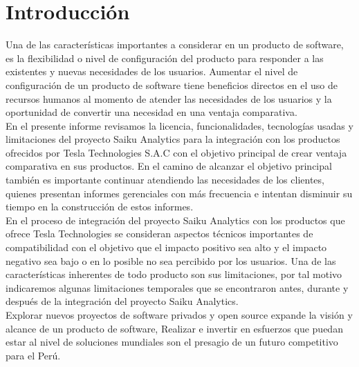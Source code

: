 \clearpage
{}
{}

\chapter*{Introducción}
\begin{spacing}{1.5}
	Una de las características importantes a considerar en un producto de software, es la flexibilidad o nivel de configuración del producto para responder a las existentes y nuevas necesidades de los usuarios. Aumentar el nivel de configuración de un producto de software tiene beneficios directos en el uso de recursos humanos al momento de atender las necesidades de los usuarios y la oportunidad de convertir una necesidad en una ventaja comparativa.\\
	En el presente informe revisamos la licencia, funcionalidades, tecnologías usadas y limitaciones del proyecto Saiku Analytics para la integración con los productos ofrecidos por Tesla Technologies S.A.C con el objetivo principal de crear ventaja comparativa en sus productos.
	En el camino de alcanzar el objetivo principal también es importante continuar atendiendo las necesidades de los clientes, quienes presentan informes gerenciales con más frecuencia e intentan disminuir su tiempo en la construcción de estos informes.\\
	En el proceso de integración del proyecto Saiku Analytics con los productos que ofrece Tesla Technologies se consideran aspectos técnicos importantes de compatibilidad con el objetivo que el impacto positivo sea alto y el impacto negativo sea bajo o en lo posible no sea percibido por los usuarios. 
	Una de las características inherentes de todo producto son sus limitaciones, por tal motivo indicaremos algunas limitaciones temporales que se encontraron antes, durante y después de la integración del proyecto Saiku Analytics.\\
	Explorar nuevos proyectos de software privados y open source expande la visión y alcance de un producto de software, Realizar e invertir en esfuerzos que puedan estar al nivel de soluciones mundiales son el presagio de un futuro competitivo para el Perú.\\
\end{spacing}
